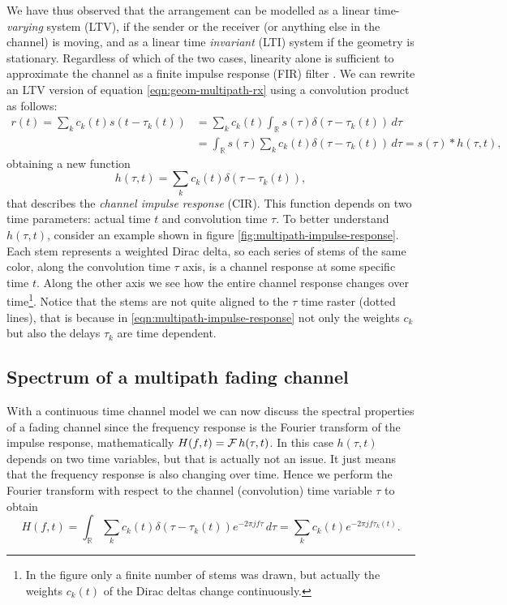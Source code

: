 We have thus observed that the arrangement can be modelled as a linear time-\emph{varying} system (LTV), if the sender or the receiver (or anything else in the channel) is moving, and as a linear time \emph{invariant} (LTI) system if the geometry is stationary. Regardless of which of the two cases, linearity alone is sufficient to approximate the channel as a finite impulse response (FIR) filter \cite{Messier}. We can rewrite an LTV version of equation \eqref{eqn:geom-multipath-rx} using a convolution product as follows:
\begin{align*}
	r(t) = \sum_k c_k(t) s(t - \tau_k(t)) &= \sum_k c_k(t) \int_\mathbb{R} s(\tau) \delta(\tau - \tau_k(t)) \,d\tau \\
		&= \int_\mathbb{R} s(\tau) \sum_k c_k(t) \delta(\tau - \tau_k(t)) \,d\tau = s(\tau) * h(\tau, t),
\end{align*}
obtaining a new function
\begin{equation} \label{eqn:multipath-impulse-response}
	h(\tau, t) = \sum_k c_k(t) \delta(\tau - \tau_k(t)),
\end{equation}
that describes the \emph{channel impulse response} (CIR). This function depends on two time parameters: actual time \(t\) and convolution time \(\tau\). To better understand \(h(\tau, t)\), consider an example shown in figure \ref{fig:multipath-impulse-response}. Each stem represents a weighted Dirac delta, so each series of stems of the same color, along the convolution time \(\tau\) axis, is a channel response at some specific time \(t\). Along the other axis we see how the entire channel response changes over time\footnote{In the figure only a finite number of stems was drawn, but actually the weights \(c_k(t)\) of the Dirac deltas change continuously.}. Notice that the stems are not quite aligned to the \(\tau\) time raster (dotted lines), that is because in \eqref{eqn:multipath-impulse-response} not only the weights \(c_k\) but also the delays \(\tau_k\) are time dependent.

\subsection{Spectrum of a multipath fading channel}

With a continuous time channel model we can now discuss the spectral properties of a fading channel since the frequency response is the Fourier transform of the impulse response, mathematically \(H(f, t) = \operatorname{\mathcal{F}} h(\tau, t)\). In this case \(h(\tau, t)\) depends on two time variables, but that is actually not an issue. It just means that the frequency response is also changing over time. Hence we perform the Fourier transform with respect to the channel (convolution) time variable \(\tau\) to obtain
\begin{equation} \label{eqn:multipath-frequency-response}
	H(f, t) = \int_\mathbb{R} \sum_k c_k(t) \delta(\tau - \tau_k(t)) e^{-2\pi jf\tau} \, d\tau
	= \sum_k c_k(t) e^{-2\pi jf \tau_k(t)}.
\end{equation}

